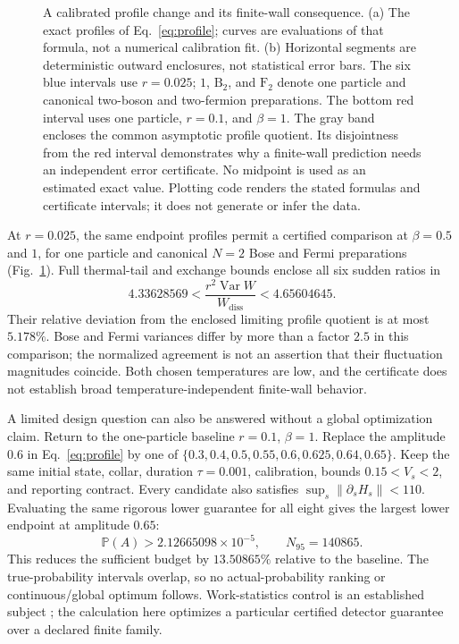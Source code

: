 \documentclass[aps,pra,reprint,superscriptaddress,longbibliography]{revtex4-2}
\newcommand{\Var}{\operatorname{Var}}
\newcommand{\Wd}{W_{\mathrm{diss}}}
\newcommand{\Prob}{\mathbb P}
\newcommand{\norm}[1]{\left\lVert#1\right\rVert}
\begin{document}
\begin{figure}[t]
\caption{A calibrated profile change and its finite-wall consequence. (a) The exact profiles of Eq.~\eqref{eq:profile}; curves are evaluations of that formula, not a numerical calibration fit. (b) Horizontal segments are deterministic outward enclosures, not statistical error bars. The six blue intervals use $r=0.025$; $1$, $\mathrm B_2$, and $\mathrm F_2$ denote one particle and canonical two-boson and two-fermion preparations. The bottom red interval uses one particle, $r=0.1$, and $\beta=1$. The gray band encloses the common asymptotic profile quotient. Its disjointness from the red interval demonstrates why a finite-wall prediction needs an independent error certificate. No midpoint is used as an estimated exact value. Plotting code renders the stated formulas and certificate intervals; it does not generate or infer the data.}
\label{fig:profile-ratios}
\end{figure}

At $r=0.025$, the same endpoint profiles permit a certified comparison at $\beta=0.5$ and $1$, for one particle and canonical $N=2$ Bose and Fermi preparations (Fig.~\ref{fig:profile-ratios}). Full thermal-tail and exchange bounds enclose all six sudden ratios in
\begin{equation}
 4.33628569<\frac{r^2\Var W}{\Wd}<4.65604645.\label{eq:preparations}
\end{equation}
Their relative deviation from the enclosed limiting profile quotient is at most $5.178\%$. Bose and Fermi variances differ by more than a factor $2.5$ in this comparison; the normalized agreement is not an assertion that their fluctuation magnitudes coincide. Both chosen temperatures are low, and the certificate does not establish broad temperature-independent finite-wall behavior.

A limited design question can also be answered without a global optimization claim. Return to the one-particle baseline $r=0.1$, $\beta=1$. Replace the amplitude $0.6$ in Eq.~\eqref{eq:profile} by one of $\{0.3,0.4,0.5,0.55,0.6,0.625,0.64,0.65\}$. Keep the same initial state, collar, duration $\tau=0.001$, calibration, bounds $0.15<V_s<2$, and reporting contract. Every candidate also satisfies $\sup_s\norm{\partial_sH_s}<110$. Evaluating the same rigorous lower guarantee for all eight gives the largest lower endpoint at amplitude $0.65$:
\begin{equation}
 \Prob(A)>2.12665098\times10^{-5},\qquad N_{95}=140865.
 \label{eq:design}
\end{equation}
This reduces the sufficient budget by $13.50865\%$ relative to the baseline. The true-probability intervals overlap, so no actual-probability ranking or continuous/global optimum follows. Work-statistics control is an established subject \cite{Solon,Miller}; the calculation here optimizes a particular certified detector guarantee over a declared finite family.
\end{document}
